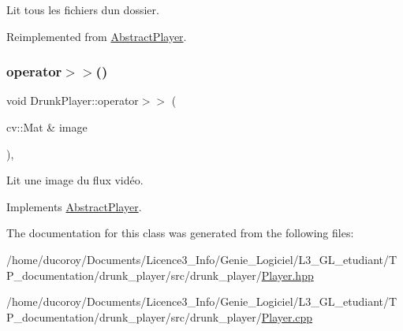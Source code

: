 Lit tous les fichiers d\textquotesingle{}un dossier. 



Reimplemented from \hyperlink{classAbstractPlayer_a2091b1757bfd13116dfa4612af55473b}{Abstract\+Player}.

\mbox{\label{classDrunkPlayer_a2662f5010e15c95ca6639f56f012aed1}} 
\subsubsection{\texorpdfstring{operator$>$$>$()}{operator>>()}}
{\footnotesize\ttfamily void Drunk\+Player\+::operator$>$$>$ (\begin{DoxyParamCaption}\item[{cv\+::\+Mat \&}]{image }\end{DoxyParamCaption})\hspace{0.3cm}{\ttfamily [override]}, {\ttfamily [virtual]}}



Lit une image du flux vidéo. 



Implements \hyperlink{classAbstractPlayer_a5c9a863c96224dd297aa44c69010cd94}{Abstract\+Player}.



The documentation for this class was generated from the following files\+:\begin{DoxyCompactItemize}
\item 
/home/ducoroy/\+Documents/\+Licence3\+\_\+\+Info/\+Genie\+\_\+\+Logiciel/\+L3\+\_\+\+G\+L\+\_\+etudiant/\+T\+P\+\_\+documentation/drunk\+\_\+player/src/drunk\+\_\+player/\hyperlink{Player_8hpp}{Player.\+hpp}\item 
/home/ducoroy/\+Documents/\+Licence3\+\_\+\+Info/\+Genie\+\_\+\+Logiciel/\+L3\+\_\+\+G\+L\+\_\+etudiant/\+T\+P\+\_\+documentation/drunk\+\_\+player/src/drunk\+\_\+player/\hyperlink{Player_8cpp}{Player.\+cpp}\end{DoxyCompactItemize}
